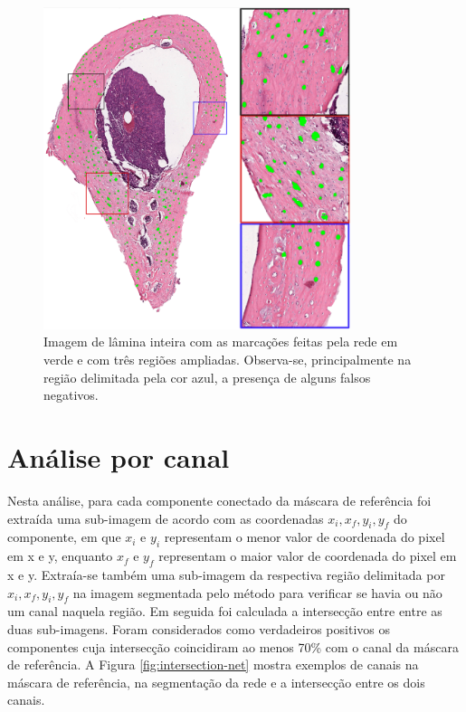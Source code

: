 \begin{figure}
    \center
    \includegraphics[width=0.8\textwidth]{figures/4_results/302areas_reduzida.png}
   
    \caption[Imagem marcada pela rede com regiões ampliadas]{Imagem de lâmina inteira com as marcações feitas pela rede em verde e com três regiões ampliadas. Observa-se, principalmente na região delimitada pela cor azul, a presença de alguns falsos negativos.}
    \label{fig:marcacoes-final-regioes}
\end{figure}


\section{Análise por canal}

Nesta análise, para cada componente conectado da máscara de referência foi extraída uma sub-imagem de acordo com as coordenadas \(x_i, x_f, y_i, y_f\) do componente, em que $x_i$  e $y_i$ representam o menor valor de coordenada do pixel em x e y,  enquanto $x_f$ e $y_f$ representam o maior valor de coordenada do pixel em x e y. Extraía-se também uma sub-imagem da respectiva região delimitada por \(x_i, x_f, y_i, y_f\) na imagem segmentada pelo método para verificar se havia ou não um canal naquela região. Em seguida foi calculada a intersecção entre entre as duas sub-imagens. Foram considerados como verdadeiros positivos os componentes cuja intersecção coincidiram ao menos 70\% com o canal da máscara de referência. A Figura \ref{fig:intersection-net} mostra exemplos de canais na máscara de referência, na segmentação da rede e a intersecção entre os dois canais. 

